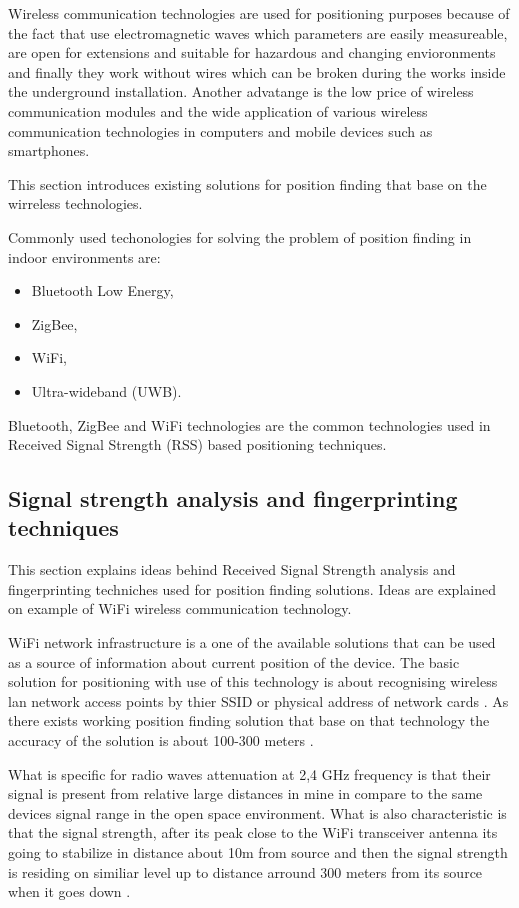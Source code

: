 \documentclass[../main.tex]{subfiles}
\begin{document}
Wireless communication technologies are used for positioning purposes because of the fact that use electromagnetic waves which parameters are easily measureable, are open for extensions and suitable for hazardous and changing envioronments and finally they work without wires which can be broken during the works inside the underground installation. Another advatange is the low price of wireless communication modules and the wide application of various wireless communication technologies in computers and mobile devices such as smartphones.

This section introduces existing solutions for position finding that base on the wirreless technologies.

Commonly used techonologies for solving the problem of position finding in indoor environments are\cite{positioning_tests}:
\begin{itemize}
	\item Bluetooth Low Energy,
	\item ZigBee,
	\item WiFi,
	\item Ultra-wideband (UWB).
\end{itemize}

Bluetooth, ZigBee and WiFi technologies are the common technologies used in Received Signal Strength (RSS) based positioning techniques.

\subsection{Signal strength analysis and fingerprinting techniques} %
\label{sub:wifi_fingerprinting}

This section explains ideas behind Received Signal Strength analysis and fingerprinting techniches used for position finding solutions. Ideas are explained on example of WiFi wireless communication technology.

WiFi network infrastructure is a one of the available solutions that can be used as a source of information about current position of the device. The basic solution for positioning with use of this technology is about recognising wireless lan network access points by thier SSID or physical address of network cards \cite{WLAN_fingerprinting}. As there exists working position finding solution that base on that technology the accuracy of the solution is about 100-300 meters \cite{thesis_tablet_positioning}.

What is specific for radio waves attenuation at 2,4 GHz frequency is that their signal is present from relative large distances in mine in compare to the same devices signal range in the open space environment. What is also characteristic is that the signal strength, after its peak close to the WiFi transceiver antenna its going to stabilize in distance about 10m from source and then the signal strength is residing on similiar level up to distance arround 300 meters from its source when it goes down \cite{Thesis_CM}.
\end{document}
